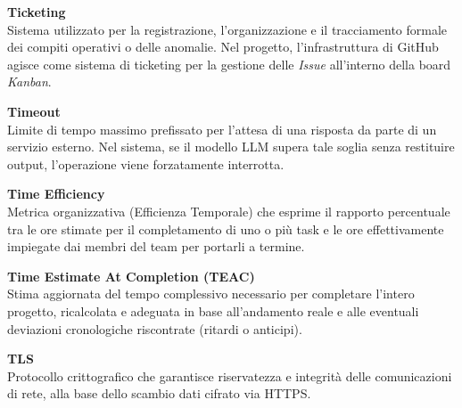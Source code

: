 \documentclass[12pt, a4paper]{article}
\begin{document}
\noindent\hypertarget{ticketing}{\textbf{Ticketing}} \\[0.1em]
Sistema utilizzato per la registrazione, l'organizzazione e il tracciamento formale dei compiti operativi o delle anomalie. Nel progetto, l'infrastruttura di GitHub agisce come sistema di ticketing per la gestione delle \textit{Issue} all'interno della board \textit{Kanban}.
\vspace{0.5cm}  

\noindent\hypertarget{timeout}{\textbf{Timeout}} \\[0.1em]
Limite di tempo massimo prefissato per l'attesa di una risposta da parte di un servizio esterno. Nel sistema, se il modello LLM supera tale soglia senza restituire output, l'operazione viene forzatamente interrotta.
\vspace{0.5cm}  

\noindent\hypertarget{time-efficiency}{\textbf{Time Efficiency}} \\[0.1em]
Metrica organizzativa (Efficienza Temporale) che esprime il rapporto percentuale tra le ore stimate per il completamento di uno o più task e le ore effettivamente impiegate dai membri del team per portarli a termine.
\vspace{0.5cm}

\noindent\hypertarget{time-estimate-at-completion}{\textbf{Time Estimate At Completion (TEAC)}} \\[0.1em]
Stima aggiornata del tempo complessivo necessario per completare l'intero progetto, ricalcolata e adeguata in base all'andamento reale e alle eventuali deviazioni cronologiche riscontrate (ritardi o anticipi).
\vspace{0.5cm}

\noindent\hypertarget{tls}{\textbf{TLS}} \\[0.1em]
Protocollo crittografico che garantisce riservatezza e integrità delle comunicazioni di rete, alla base dello scambio dati cifrato via HTTPS.
\vspace{0.5cm}
\end{document}
